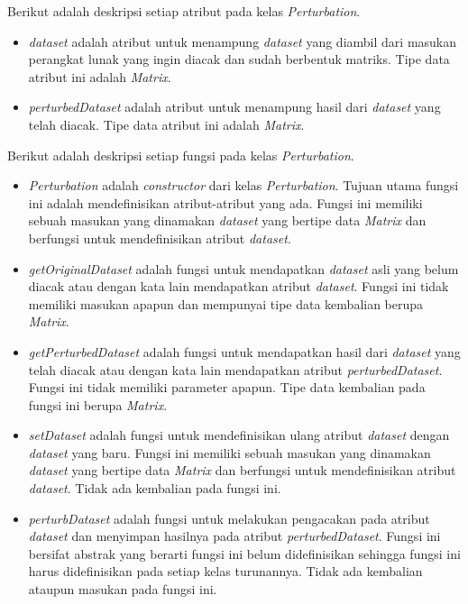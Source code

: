 Berikut adalah deskripsi setiap atribut pada kelas \textit{Perturbation}.
\begin{itemize}
	\item \textit{\textit{dataset}} adalah atribut untuk menampung \textit{dataset} yang diambil dari masukan perangkat lunak yang ingin diacak dan sudah berbentuk matriks. Tipe data atribut ini adalah \textit{Matrix}.
	\item \textit{perturbedDataset} adalah atribut untuk menampung hasil dari \textit{dataset} yang telah diacak. Tipe data atribut ini adalah \textit{Matrix}.
\end{itemize}

Berikut adalah deskripsi setiap fungsi pada kelas \textit{Perturbation}.
\begin{itemize}
	\item \textit{Perturbation} adalah \textit{constructor} dari kelas \textit{Perturbation}. Tujuan utama fungsi ini adalah mendefinisikan atribut-atribut yang ada. Fungsi ini memiliki sebuah masukan yang dinamakan \textit{\textit{dataset}} yang bertipe data \textit{Matrix} dan berfungsi untuk mendefinisikan atribut \textit{\textit{dataset}}.
	\item \textit{getOriginalDataset} adalah fungsi untuk mendapatkan \textit{dataset} asli yang belum diacak atau dengan kata lain mendapatkan atribut \textit{\textit{dataset}}. Fungsi ini tidak memiliki masukan apapun dan mempunyai tipe data kembalian berupa \textit{Matrix}.
	\item \textit{getPerturbedDataset} adalah fungsi untuk mendapatkan hasil dari \textit{dataset} yang telah diacak atau dengan kata lain mendapatkan atribut \textit{perturbedDataset}. Fungsi ini tidak memiliki parameter apapun. Tipe data kembalian pada fungsi ini berupa \textit{Matrix}.
	\item \textit{setDataset} adalah fungsi untuk mendefinisikan ulang atribut \textit{\textit{dataset}} dengan \textit{dataset} yang baru. Fungsi ini memiliki sebuah masukan yang dinamakan \textit{\textit{dataset}} yang bertipe data \textit{Matrix} dan berfungsi untuk mendefinisikan atribut \textit{\textit{dataset}}. Tidak ada kembalian pada fungsi ini.
	\item \textit{perturbDataset} adalah fungsi untuk melakukan pengacakan pada atribut \textit{\textit{dataset}} dan menyimpan hasilnya pada atribut \textit{perturbedDataset}. Fungsi ini bersifat abstrak yang berarti fungsi ini belum didefinisikan sehingga fungsi ini harus didefinisikan pada setiap kelas turunannya. Tidak ada kembalian ataupun masukan pada fungsi ini.
\end{itemize}

